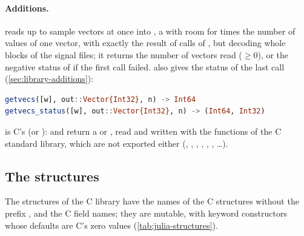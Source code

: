 \paragraph{Additions.}  reads up to  sample vectors at once
into , a  with room for  times the number of
values of one vector, with exactly the result of  calls of , but
decoding whole blocks of the signal files; it returns the number of vectors read
($\ge 0$), or the negative status of  if the first call failed.
 also gives the status of the last  call
(\cref{sec:library-additions}):
\begin{lstlisting}[language=Julia]
getvecs([w], out::Vector{Int32}, n) -> Int64
getvecs_status([w], out::Vector{Int32}, n) -> (Int64, Int32)
\end{lstlisting}
 is C's  (or ): 
and  return a  or , read and
written with the functions of the C standard library, which are not exported either
(, , , ,
, , \ldots).

\subsection{The structures}
\label{sec:julia-structures}

The structures of the C library have the names of the C structures without the prefix
, and the C field names; they are mutable, with keyword constructors whose
defaults are C's zero values (\cref{tab:julia-structures}).

